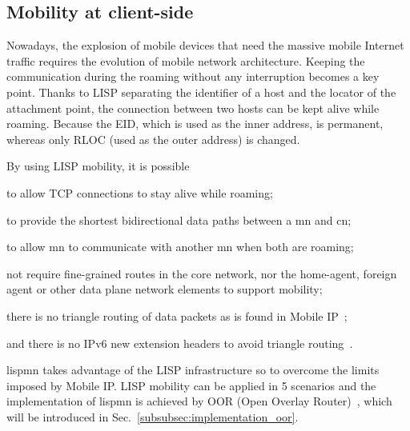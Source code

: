 \subsection{Mobility at client-side}
\label{subsubsec:mobility_user}
Nowadays, the explosion of mobile devices that need the massive mobile Internet traffic requires the evolution of mobile network architecture. Keeping the communication during the roaming without any interruption becomes a key point. Thanks to LISP separating the identifier of a host and the locator of the attachment point, the connection between two hosts can be kept alive while roaming. Because the EID, which is used as the inner address, is permanent, whereas only RLOC (used as the outer address) is changed. 

By using LISP mobility, it is possible 
\begin{inparaenum}[1)]
	\item to allow TCP connections to stay alive while roaming;
	\item to provide the shortest bidirectional data paths between a \acrfull{mn} and \acrfull{cn};
	\item to allow \acrshort{mn} to communicate with another \acrshort{mn} when both are roaming;
	\item not require fine-grained routes in the core network, nor the home-agent, foreign agent or other data plane network elements to support mobility;
	\item there is no triangle routing of data packets as is found in Mobile IP~\cite{perkins2002rfc3344};
	\item and there is no IPv6 new extension headers to avoid triangle routing~\cite{johnson2004rfc}.
\end{inparaenum}
\acrfull{lispmn} takes advantage of the LISP infrastructure so to overcome the limits imposed by Mobile IP. LISP mobility can be applied in 5 scenarios and the implementation of \acrshort{lispmn} is achieved by OOR (Open Overlay Router)~\cite{OOR}, which will be introduced in Sec.~\ref{subsubsec:implementation_oor}.



